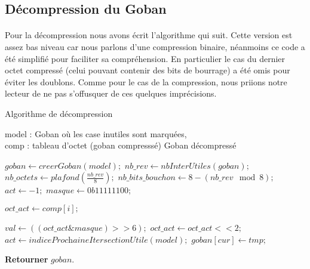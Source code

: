     
        \subsection{Décompression du Goban}
            \paragraph{}Pour la décompression nous avons écrit l’algorithme qui suit. Cette version est assez bas niveau car nous parlons d’une compression binaire, néanmoins ce code a été simplifié pour faciliter sa compréhension. En particulier le cas du dernier octet compressé (celui pouvant contenir des bits de bourrage) a été omis pour éviter les doublons. Comme pour le cas de la compression, nous priions notre lecteur de ne pas s’offusquer de ces quelques imprécisions.
    
            \begin{algorithm}
                \caption{Algorithme de décompression}
                \begin{algorithmic}
                \REQUIRE model : Goban où les case inutiles sont marquées, \\
                comp : tableau d'octet (goban compresssé)
                \ENSURE Goban décompressé
                
                \STATE $goban \leftarrow \textit{creerGoban}(model);$
                \STATE $nb\_rev \leftarrow \textit{nbInterUtiles}(goban);$
                \STATE $nb\_octets \leftarrow \textit{plafond}(\frac{nb\_rev}{8});$
                \STATE $nb\_bits\_bouchon \leftarrow 8 - (nb\_rev \mod 8);$
                \STATE $act \leftarrow -1;$
                \STATE $masque \leftarrow 0b11111100;$
                
                    \STATE $oct\_act \leftarrow comp[i];$
                    
                        \STATE $val \leftarrow ((oct\_act \& masque) >> 6);$
                        \STATE $oct\_act \leftarrow oct\_act << 2;$
                        \STATE $act \leftarrow \textit{indiceProchaineItersectionUtile}(model);$
                        \STATE $goban[cur] \leftarrow tmp;$
                    \ENDFOR
                \ENDFOR
                
                \STATE \textbf{Retourner} $goban$.
            \end{algorithmic}
            \end{algorithm}


